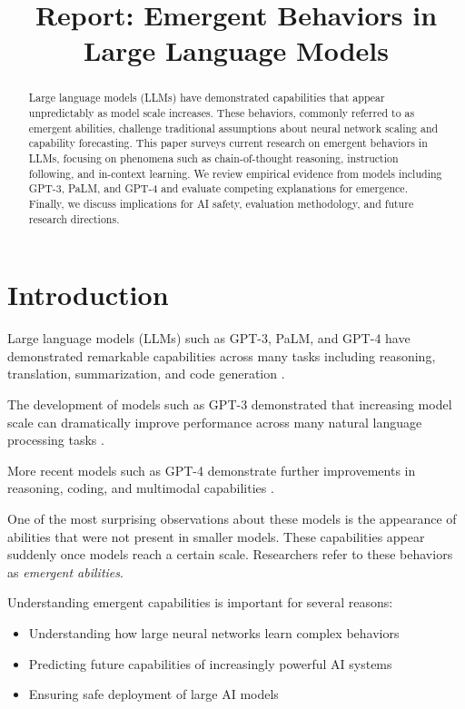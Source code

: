 \documentclass[conference]{IEEEtran}
\title{Report: Emergent Behaviors in Large Language Models}
\author{
\IEEEauthorblockN{Adarsh Kumar Singh\\Ansh Singh}
\IEEEauthorblockA{
Bengaluru, Karnataka, India\\
Email: anshsactivity2024@gmail.com
}
}
\begin{document}
\maketitle

\begin{abstract}
Large language models (LLMs) have demonstrated capabilities that appear unpredictably as model scale increases. These behaviors, commonly referred to as emergent abilities, challenge traditional assumptions about neural network scaling and capability forecasting. This paper surveys current research on emergent behaviors in LLMs, focusing on phenomena such as chain-of-thought reasoning, instruction following, and in-context learning. We review empirical evidence from models including GPT-3, PaLM, and GPT-4 and evaluate competing explanations for emergence. Finally, we discuss implications for AI safety, evaluation methodology, and future research directions.
\end{abstract}

\section{Introduction}

Large language models (LLMs) such as GPT-3, PaLM, and GPT-4 have demonstrated remarkable capabilities across many tasks including reasoning, translation, summarization, and code generation \cite{wei2022emergent}.

The development of models such as GPT-3 demonstrated that increasing model scale can dramatically improve performance across many natural language processing tasks \cite{brown2020gpt3}.

More recent models such as GPT-4 demonstrate further improvements in reasoning, coding, and multimodal capabilities \cite{openai2023gpt4}.

One of the most surprising observations about these models is the appearance of abilities that were not present in smaller models. These capabilities appear suddenly once models reach a certain scale. Researchers refer to these behaviors as \textit{emergent abilities}.

Understanding emergent capabilities is important for several reasons:

\begin{itemize}
\item Understanding how large neural networks learn complex behaviors
\item Predicting future capabilities of increasingly powerful AI systems
\item Ensuring safe deployment of large AI models
\end{itemize}
\end{document}
